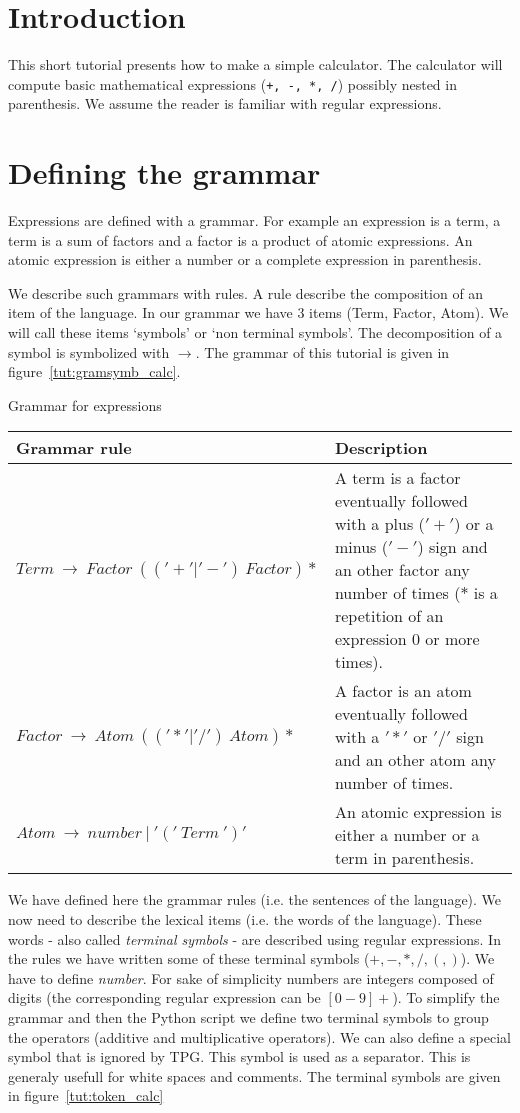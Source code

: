 \section{Introduction}

This short tutorial presents how to make a simple calculator.
The calculator will compute basic mathematical expressions (\verb|+, -, *, /|) possibly nested in parenthesis.
We assume the reader is familiar with regular expressions.

\section{Defining the grammar}

Expressions are defined with a grammar.
For example an expression is a term, a term is a sum of factors and a factor is a product of atomic expressions. An atomic expression is either a number or a complete expression in parenthesis.

We describe such grammars with rules. A rule describe the composition of an item of the language. In our grammar we have 3 items (Term, Factor, Atom). We will call these items `symbols' or `non terminal symbols'. The decomposition of a symbol is symbolized with $\to$.
The grammar of this tutorial is given in figure~\ref{tut:gramsymb_calc}.

\begin{tableau}
\caption{Grammar for expressions} \label{tut:gramsymb_calc}
\begin{tabular}{| l | p{7cm} |}
\hline
	Grammar rule & Description \\
\hline
\hline
	$Term~\to~Factor~(('+'|'-')~Factor)*$
		& A term is a factor eventually followed with a plus ($'+'$) or a minus ($'-'$) sign and an other factor any number of times ($*$ is a repetition of an expression 0 or more times). \\
\hline
	$Factor~\to~Atom~(('*'|'/')~Atom)*$
		& A factor is an atom eventually followed with a $'*'$ or $'/'$ sign and an other atom any number of times. \\
\hline
	$Atom~\to~number~|~'('~Term~')'$
		& An atomic expression is either a number or a term in parenthesis. \\
\hline
\end{tabular}
\end{tableau}

We have defined here the grammar rules (i.e. the sentences of the language). We now need to describe the lexical items (i.e. the words of the language). These words - also called \emph{terminal symbols} - are described using regular expressions. In the rules we have written some of these terminal symbols ($+, -, *, /, (, )$). We have to define \emph{number}. For sake of simplicity numbers are integers composed of digits (the corresponding regular expression can be $[0-9]+$).
To simplify the grammar and then the Python script we define two terminal symbols to group the operators (additive and multiplicative operators). We can also define a special symbol that is ignored by TPG. This symbol is used as a separator. This is generaly usefull for white spaces and comments. The terminal symbols are given in figure~\ref{tut:token_calc}

